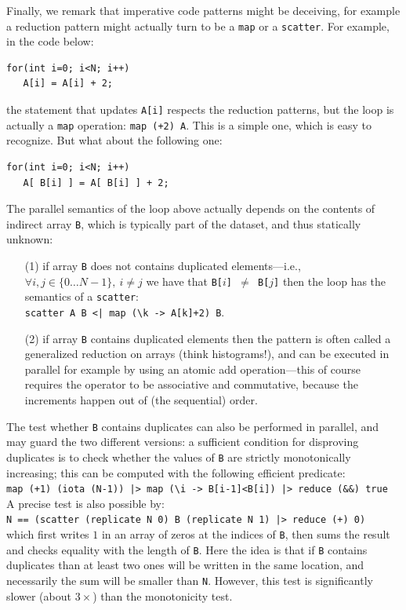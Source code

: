 \documentclass[acmsmall,review]{acmart}\settopmatter{printfolios=true,printccs=false,printacmref=false}
\begin{document}
Finally, we remark that imperative code patterns might be
deceiving, for example a reduction pattern might actually
turn to be a \lstinline{map} or a \lstinline{scatter}.
For example, in the code below:
\begin{lstlisting}[mathescape=true]
for(int i=0; i<N; i++)
   A[i] = A[i] + 2;
\end{lstlisting}\vspace{-2ex}
the statement that updates {\tt A[i]} respects the reduction
patterns, but the loop is actually a \lstinline{map} operation:
\lstinline{map (+2) A}.   This is a simple one, which is
easy to recognize. But what about the following one:
\begin{lstlisting}[mathescape=true]
for(int i=0; i<N; i++)
   A[ B[i] ] = A[ B[i] ] + 2;
\end{lstlisting}\vspace{-2ex}
The parallel semantics of the loop above actually depends on the
contents of indirect array {\tt B}, which is typically part of the
dataset, and thus statically unknown:
\begin{itemize}
    \item[(1)] if array {\tt B} does not contains duplicated 
        elements---i.e., $\forall i,j\in\{0\ldots N-1\}, \ i\neq j$ we have
        that {\tt B[$i$] $\neq$ B[$j$]} then the loop has the
        semantics of a \lstinline{scatter}:\\
        \lstinline{scatter A B <| map (\k -> A[k]+2) B}.
    \item[(2)] if array {\tt B} contains duplicated elements
        then the pattern is often called a generalized reduction
        on arrays (think histograms!), and can be executed in parallel 
        for example by using an atomic add operation---this of course 
        requires the operator to be associative and commutative, because
        the increments happen out of (the sequential) order.   
\end{itemize}
The test whether {\tt B} contains duplicates can also be performed
in parallel, and may guard the two different versions: a sufficient
condition for disproving duplicates is to check whether the values 
of {\tt B} are strictly monotonically increasing; this can be 
computed with the following efficient predicate:\\
\lstinline{map (+1) (iota (N-1)) |> map (\i -> B[i-1]<B[i]) |> reduce (&&) true}\\
A precise test is also possible by:\\
\lstinline{N == (scatter (replicate N 0) B (replicate N 1) |> reduce (+) 0)}\\
which first writes $1$ in an array of zeros at the indices of {\tt B}, then
sums the result and checks equality with the length of {\tt B}. Here the idea
is that if {\tt B} contains duplicates than at least two ones will be
written in the same location, and necessarily the sum will be smaller than
{\tt N}. However, this test is significantly slower (about $3\times$) than 
the monotonicity test. 
\end{document}
